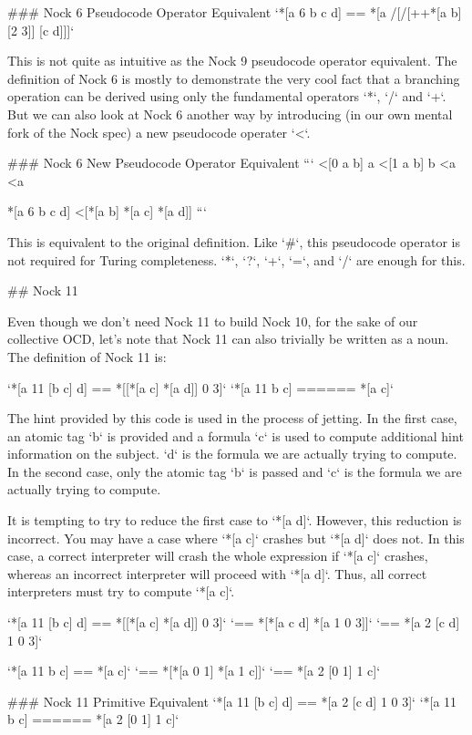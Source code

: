 \documentclass[twoside]{article}
\begin{document}
### Nock 6 Pseudocode Operator Equivalent
`*[a 6 b c d] == *[a /[/[++*[a b] [2 3]] [c d]]]`

This is not quite as intuitive as the Nock 9 pseudocode operator equivalent. The definition of Nock 6 is mostly to demonstrate the very cool fact that a branching operation can be derived using only the fundamental operators `*`, `/` and `+`. But we can also look at Nock 6 another way by introducing (in our own mental fork of the Nock spec) a new pseudocode operater `<`.

### Nock 6 New Pseudocode Operator Equivalent
```
<[0 a b]          a
<[1 a b]          b
<a                <a

*[a 6 b c d]      <[*[a b] *[a c] *[a d]]
```

This is equivalent to the original definition. Like `#`, this pseudocode operator is not required for Turing completeness. `*`, `?`, `+`, `=`, and `/` are enough for this. 

## Nock 11

Even though we don't need Nock 11 to build Nock 10, for the sake of our collective OCD, let's note that Nock 11 can also trivially be written as a noun. The definition of Nock 11 is:

`*[a 11 [b c] d] == *[[*[a c] *[a d]] 0 3]`  
`*[a 11 b c] ====== *[a c]`  

The hint provided by this code is used in the process of jetting. In the first case, an atomic tag `b` is provided and a formula `c` is used to compute additional hint information on the subject. `d` is the formula we are actually trying to compute. In the second case, only the atomic tag `b` is passed and `c` is the formula we are actually trying to compute.

It is tempting to try  to reduce the first case to `*[a d]`. However, this reduction is incorrect. You may have a case where `*[a c]` crashes but `*[a d]` does not. In this case, a correct interpreter will crash the whole expression if `*[a c]` crashes, whereas an incorrect interpreter will proceed with `*[a d]`. Thus, all correct interpreters must try
to compute `*[a c]`.

`*[a 11 [b c] d] == *[[*[a c] *[a d]] 0 3]`  
`== *[*[a c d] *[a 1 0 3]]`  
`== *[a 2 [c d] 1 0 3]`  

`*[a 11 b c] == *[a c]`  
`== *[*[a 0 1] *[a 1 c]]`
`== *[a 2 [0 1] 1 c]`

### Nock 11 Primitive Equivalent
`*[a 11 [b c] d] == *[a 2 [c d] 1 0 3]`  
`*[a 11 b c] ====== *[a 2 [0 1] 1 c]`
\end{document}
